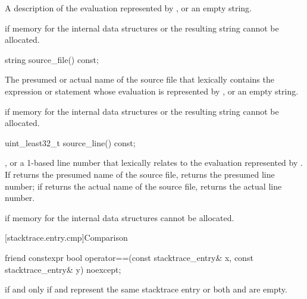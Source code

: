 \begin{itemdescr}
\pnum
\returns
A description of the evaluation represented by ,
or an empty string.

\pnum
\throws
{} if memory for
the internal data structures or the resulting string cannot be allocated.
\end{itemdescr}

%
\begin{itemdecl}
string source_file() const;
\end{itemdecl}

\begin{itemdescr}
\pnum
\returns
The presumed or actual name of the source file
that lexically contains the expression or statement
whose evaluation is represented by , or an empty string.

\pnum
\throws
{} if memory for
the internal data structures or the resulting string cannot be allocated.
\end{itemdescr}

%
\begin{itemdecl}
uint_least32_t source_line() const;
\end{itemdecl}

\begin{itemdescr}
\pnum
\returns
{}, or a 1-based line number that lexically relates to the evaluation
represented by .
If  returns the presumed name of the source file,
returns the presumed line number;
if  returns the actual name of the source file,
returns the actual line number.

\pnum
\throws
{} if memory for
the internal data structures cannot be allocated.
\end{itemdescr}

[stacktrace.entry.cmp]{Comparison}

%
\begin{itemdecl}
friend constexpr bool operator==(const stacktrace_entry& x, const stacktrace_entry& y) noexcept;
\end{itemdecl}

\begin{itemdescr}
\pnum
\returns
{} if and only if  and  represent
the same stacktrace entry or both  and  are empty.
\end{itemdescr}

